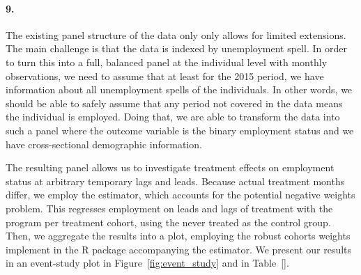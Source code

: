 \documentclass{scrartcl}
\begin{document}
\paragraph*{9.}

The existing panel structure of the data only only allows for limited extensions. The main challenge is that the data is indexed by unemployment spell. In order to turn this into a full, balanced panel at the individual level with monthly observations, we need to assume that at least for the 2015 period, we have information about all unemployment spells of the individuals. In other words, we should be able to safely assume that any period not covered in the data means the individual is employed. Doing that, we are able to transform the data into such a panel where the outcome variable is the binary employment status and we have cross-sectional demographic information.

The resulting panel allows us to investigate treatment effects on employment status at arbitrary temporary lags and leads. Because actual treatment months differ, we employ the \cite{callawayDifferenceinDifferencesMultipleTime2020} estimator, which accounts for the potential negative weights problem. This regresses employment on leads and lags of treatment with the program per treatment cohort, using the never treated as the control group. Then, we aggregate the results into a plot, employing the robust cohorts weights implement in the R package accompanying the estimator. We present our results in an event-study plot in Figure~\ref{fig:event_study} and in Table~\ref{}.
\end{document}
